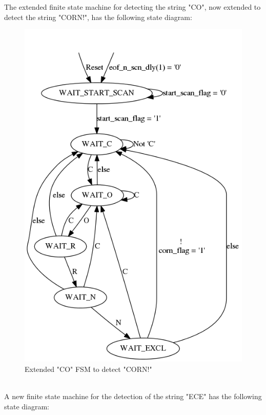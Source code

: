 \documentclass{article}
\begin{document}
The extended finite state machine for detecting the string "CO", now extended to detect the string "CORN!", has the following state diagram:
	\begin{figure}[h]
		\begin{center}
			\includegraphics[scale=0.40]{../graphviz/part_3_state_diagram_CORN.png}
			\caption{Extended "CO" FSM to detect "CORN!"}
		\end{center}
	\end{figure}
\\
A new finite state machine for the detection of the string "ECE" has the following state diagram:
\end{document}
